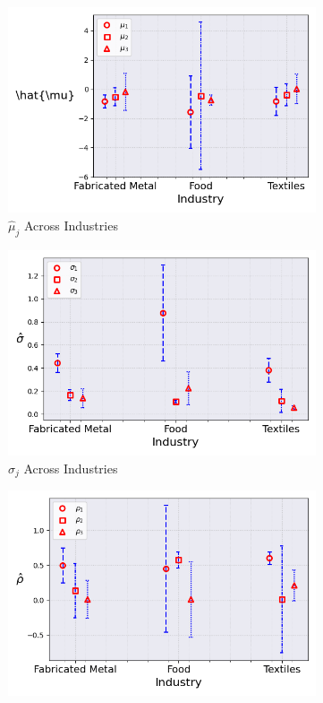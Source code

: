 \documentclass{article}
\begin{document}
\begin{figure}[ht!]
\begin{subfigure}[t]{0.32\textwidth}
        \includegraphics[width=\textwidth]{figure/ar1_mixture_mubar_across_industries_m3.png}
        \caption{$\hat{\mu}_j$ Across Industries}
    \end{subfigure}
    \begin{subfigure}[t]{0.32\textwidth}
        \centering
        \includegraphics[width=\textwidth]{figure/ar1_mixture_sigma_across_industries_m3.png}
        \caption{$\hat\sigma_j$ Across Industries}
    \end{subfigure}
    \begin{subfigure}[t]{0.32\textwidth}
        \centering
        \includegraphics[width=\textwidth]{figure/ar1_mixture_rho_across_industries_m3.png}

\end{subfigure}
\end{figure}
\end{document}
